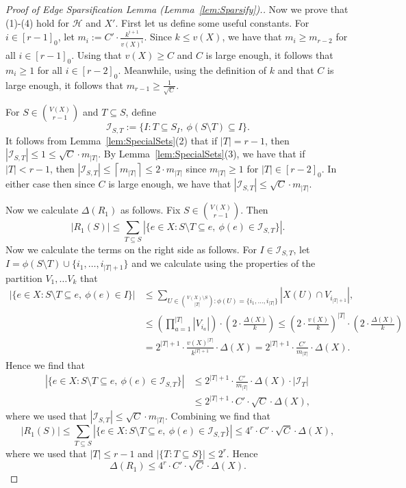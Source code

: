 \documentclass[11pt]{article}
\newcounter{i}
\theoremstyle{plain}
\theoremstyle{plain} %
\theoremstyle{definition}
\begin{document}
\begin{proof}[Proof of Edge Sparsification Lemma (Lemma~\ref{lem:Sparsify}).]
Now we prove that (1)-(4) hold for $\mathcal{H}$ and $X'$. First let us define some useful constants. For $i\in [r-1]_0$, let $m_i:= C'\cdot \frac{k^{i+1}}{v(X)^{i}}$. Since $k\le v(X)$, we have that $m_i\ge m_{r-2}$ for all $i\in [r-1]_0$. Using that $v(X)\ge C$ and $C$ is large enough, it follows that $m_i\ge 1$ for all $i\in [r-2]_0$. Meanwhile, using the definition of $k$ and that $C$ is large enough, it follows that $m_{r-1}\ge \frac{1}{\sqrt{C}}$. 

For $S\in \binom{V(X)}{r-1}$ and $T\subseteq S$, define 
$$\mathcal{I}_{S,T} := \{I: T\subseteq S_I,~\phi(S\setminus T)\subseteq I\}.$$
It follows from Lemma~\ref{lem:SpecialSets}(2) that if $|T|=r-1$, then $|\mathcal{I}_{S,T}|\le 1 \le \sqrt{C}\cdot m_{|T|}$. By Lemma~\ref{lem:SpecialSets}(3), we have that if $|T| < r-1$, then $|\mathcal{I}_{S,T}|\le \left\lceil m_{|T|} \right\rceil \le 2\cdot m_{|T|}$ since $m_{|T|}\ge 1$ for $|T|\in [r-2]_0$. In either case then since $C$ is large enough, we have that $|\mathcal{I}_{S,T}|\le \sqrt{C}\cdot m_{|T|}$. 


Now we calculate $\Delta(R_1)$ as follows. Fix $S\in \binom{V(X)}{r-1}$. 
Then
$$|R_1(S)| \le \sum_{T\subseteq S} |\{e\in X: S\setminus T\subseteq e,~\phi(e)\in \mathcal{I}_{S,T}\}|.$$
Now we calculate the terms on the right side as follows. For $I\in \mathcal{I}_{S,T}$, let $I=\phi(S\setminus T)\cup \{i_1,\ldots, i_{|T|+1}\}$ and we calculate using the properties of the partition $V_1,\ldots V_k$ that
\begin{align*}
|\{e\in X: S\setminus T\subseteq e,~\phi(e)\in I\}| &\le \sum_{U\in \binom{V(X)\setminus S}{|T|}: \phi(U)= \{i_1,\ldots, i_{|T|}\}} |X(U)\cap V_{i_{|T|+1}}|,\\
&\le \left(\prod_{a=1}^{|T|} |V_{i_a}|\right) \cdot \left(2\cdot \frac{\Delta(X)}{k}\right) \le \left(2\cdot \frac{v(X)}{k}\right)^{|T|} \cdot \left(2\cdot \frac{\Delta(X)}{k}\right)\\
&= 2^{|T|+1}\cdot \frac{v(X)^{|T|}}{k^{|T|+1}} \cdot \Delta(X) = 2^{|T|+1}\cdot \frac{C'}{m_{|T|}} \cdot \Delta(X).
\end{align*}
Hence we find that
\begin{align*}
|\{e\in X: S\setminus T\subseteq e,~\phi(e)\in \mathcal{I}_{S,T}\}| &\le 2^{|T|+1}\cdot \frac{C'}{m_{|T|}}\cdot \Delta(X)\cdot |\mathcal{I}_{T}|\\
&\le 2^{|T|+1}\cdot C'\cdot \sqrt{C} \cdot \Delta(X),
\end{align*}
where we used that $|\mathcal{I}_{S,T}|\le \sqrt{C}\cdot m_{|T|}$. Combining we find that
$$|R_1(S)| \le \sum_{T\subseteq S}  |\{e\in X: S\setminus T\subseteq e,~\phi(e)\in \mathcal{I}_{S,T}\}| \le 4^{r}\cdot C'\cdot \sqrt{C}\cdot \Delta(X),$$
where we used that $|T|\le r-1$ and $|\{T: T\subseteq S\}|\le 2^r$. Hence 
$$\Delta(R_1) \le 4^{r}\cdot C'\cdot \sqrt{C}\cdot \Delta(X).$$


\end{proof}
\end{document}
